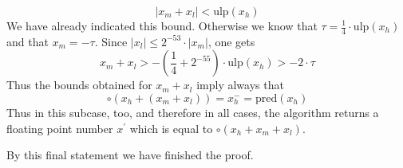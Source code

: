 \documentclass[a4paper,10pt,twoside]{article}
\newenvironment{proof}[1][Proof]{\begin{trivlist}
\item[\hskip \labelsep {\bfseries #1}]}{\end{trivlist}}
\newcommand{\qed}{\nobreak \ifvmode \relax \else \ifdim \lastskip<1.5em \hskip-\lastskip
\hskip1.5em plus0em minus0.5em \fi \nobreak \vrule height0.75em width0.5em depth0.25em\fi}
\newcommand{\hi}{\ensuremath{\mathit{h}}}
\newcommand{\mi}{\ensuremath{\mathit{m}}}
\newcommand{\lo}{\ensuremath{\mathit{l}}}
\newcommand{\mUlp}{\ensuremath{\mathrm{ulp}}}
\newcommand{\pred}{\ensuremath{\mathrm{pred}}}
\begin{document}
\begin{proof}
{\begin{enumerate}
$$\left \vert x_\mi + x_\lo \right \vert < \mUlp\left( x_\hi \right)$$
We have already indicated this bound.
Otherwise we know that $\tau = \frac{1}{4} \cdot \mUlp\left( x_\hi \right)$ and that $x_\mi = -\tau$.
Since $\left \vert x_\lo \right \vert \leq 2^{-53} \cdot \left \vert x_\mi \right \vert$, one gets
$$x_\mi + x_\lo > - \left( \frac{1}{4} + 2^{-55} \right) \cdot \mUlp\left( x_\hi \right) > -2 \cdot \tau$$
Thus the bounds obtained for $x_\mi + x_\lo$ imply always that
$$\circ \left( x_\hi + \left( x_\mi + x_\lo \right) \right) = x_\hi^- = \pred\left( x_\hi \right)$$
Thus in this subcase, too, and therefore in all cases, the algorithm returns a floating point number $x^\prime$
which is equal to $\circ \left( x_\hi + x_\mi + x_\lo \right)$.
\end{enumerate}
}
By this final statement we have finished the proof.\qed
\end{proof}
\end{document}
